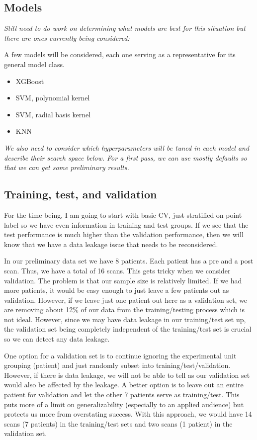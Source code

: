 \documentclass[11pt]{article}
\theoremstyle{definition}
\begin{document}
\subsection{Models}

\textit{Still need to do work on determining what models are best for this situation but there are ones currently being considered:}

A few models will be considered, each one serving as a representative for its general model class.

\begin{itemize}
    \item XGBoost
    \item SVM, polynomial kernel
    \item SVM, radial basis kernel
    \item KNN
\end{itemize}

\textit{We also need to consider which hyperparameters will be tuned in each model and describe their search space below. For a first pass, we can use mostly defaults so that we can get some preliminary results.}

\subsection{Training, test, and validation}

For the time being, I am going to start with basic CV, just stratified on point label so we have even information in training and test groups. If we see that the test performance is much higher than the validation performance, then we will know that we have a data leakage issue that needs to be reconsidered.

In our preliminary data set we have 8 patients. Each patient has a pre and a post scan. Thus, we have a total of 16 scans. This gets tricky when we consider validation. The problem is that our sample size is relatively limited. If we had more patients, it would be easy enough to just leave a few patients out as validation. However, if we leave just one patient out here as a validation set, we are removing about 12\% of our data from the training/testing process which is not ideal. However, since we may have data leakage in our training/test set up, the validation set being completely independent of the training/test set is crucial so we can detect any data leakage. 

One option for a validation set is to continue ignoring the experimental unit grouping (patient) and just randomly subset into training/test/validation. However, if there is data leakage, we will not be able to tell as our validation set would also be affected by the leakage. A better option is to leave out an entire patient for validation and let the other 7 patients serve as training/test. This puts more of a limit on generalizability (especially to an applied audience) but protects us more from overstating success. With this approach, we would have 14 scans (7 patients) in the training/test sets and two scans (1 patient) in the validation set.
\end{document}
